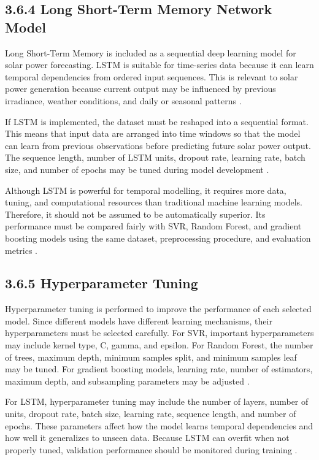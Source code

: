 \subsection{3.6.4 Long Short-Term Memory Network Model}

Long Short-Term Memory is included as a sequential deep learning model for solar power forecasting. LSTM is suitable for time-series data because it can learn temporal dependencies from ordered input sequences. This is relevant to solar power generation because current output may be influenced by previous irradiance, weather conditions, and daily or seasonal patterns \parencite{Eren2025, TsaiLo2025, Duvuru2026}.

If LSTM is implemented, the dataset must be reshaped into a sequential format. This means that input data are arranged into time windows so that the model can learn from previous observations before predicting future solar power output. The sequence length, number of LSTM units, dropout rate, learning rate, batch size, and number of epochs may be tuned during model development \parencite{TsaiLo2025, Duvuru2026, Ma2025}.

Although LSTM is powerful for temporal modelling, it requires more data, tuning, and computational resources than traditional machine learning models. Therefore, it should not be assumed to be automatically superior. Its performance must be compared fairly with SVR, Random Forest, and gradient boosting models using the same dataset, preprocessing procedure, and evaluation metrics \parencite{ArellanosTafur2025, Eren2025, CarvalhoJunior2025}.

\subsection{3.6.5 Hyperparameter Tuning}

Hyperparameter tuning is performed to improve the performance of each selected model. Since different models have different learning mechanisms, their hyperparameters must be selected carefully. For SVR, important hyperparameters may include kernel type, C, gamma, and epsilon. For Random Forest, the number of trees, maximum depth, minimum samples split, and minimum samples leaf may be tuned. For gradient boosting models, learning rate, number of estimators, maximum depth, and subsampling parameters may be adjusted \parencite{JnanaVarshitha2025, Bakht2025, Alhassan2025}.

For LSTM, hyperparameter tuning may include the number of layers, number of units, dropout rate, batch size, learning rate, sequence length, and number of epochs. These parameters affect how the model learns temporal dependencies and how well it generalizes to unseen data. Because LSTM can overfit when not properly tuned, validation performance should be monitored during training \parencite{Eren2025, TsaiLo2025, Duvuru2026}.

